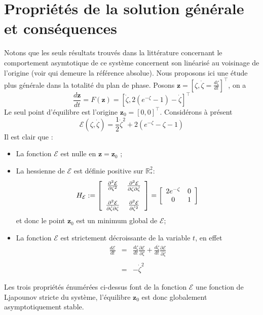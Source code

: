 \section{Propriétés de la solution générale et conséquences}
Notons que les seuls résultats trouvés dans la littérature concernant le comportement asymtotique de ce système concernent son linéarisé au voisinage de l'origine (voir \cite{chandra39} qui demeure la référence absolue). Nous proposons ici une étude plus générale dans la totalité du plan de phase. Posons $\mathbf{z}=\left[  \zeta,\dot{\zeta}=\frac{d\zeta}{dt}\right]  ^{\top}$, on a
\begin{equation}
\frac{d\mathbf{z}}{dt} =F\left(  \mathbf{z}\right)  =
\left[\dot{\zeta},2\left(  e^{-\zeta}-1\right)-\dot{\zeta}\right]^{\top} \label{sysdif}%
\end{equation}
Le seul point d'\'{e}quilibre est l'origine $\mathbf{z}_0=\left[  0,0\right]
^{\top}$. Considérons à présent  
$$
\mathcal{E}(\zeta,\dot{\zeta}) = \frac{1}{2}\dot{\zeta}^2+2(e^{-\zeta}-\zeta-1)
$$
Il est clair que :
\begin{itemize}
\item La fonction $\mathcal{E}$ est nulle en $\mathbf{z}=\mathbf{z}_0$ ;
\item La hessienne de $\mathcal{E}$ est définie positive sur $\mathbb{R}^2_*$: 
$$
H_{\mathcal{E}}:=
\left[
\begin{array}
[c]{cc}%
\frac{\partial^2 \mathcal{E}}{\partial \zeta^2}         & \frac{\partial^2 \mathcal{E}}{\partial \zeta \partial \dot{\zeta}}\\
 & \\
\frac{\partial^2 \mathcal{E}}{\partial \dot{\zeta} \partial \zeta}& \frac{\partial^2 \mathcal{E}}{\partial \dot{\zeta}^2}
\end{array}
\right]
=\left[\begin{array}
[c]{cc}%
2e^{-\zeta}         & 0\\
0& 1
\end{array}
\right]
$$
et donc le point $\mathbf{z}_0$ est un minimum global de $\mathcal{E}$;
\item La fonction $\mathcal{E}$ est strictement décroissante de la variable $t$, en effet
\begin{eqnarray*}
\frac{d\mathcal{E}}{dt}&=&\frac{d\zeta}{dt}\frac{\partial \mathcal{E}}{\partial \zeta}+\frac{d\dot{\zeta}}{dt}\frac{\partial \mathcal{E}}{\partial \dot{\zeta}} \\
& & \\
&=&-\dot{\zeta}^2 
\end{eqnarray*}

\end{itemize}
Les trois propriétés énumérées ci-dessus font de la fonction $\mathcal{E}$ une fonction de Ljapounov stricte du système, l'équilibre $\mathbf{z}_0$ est donc globalement asymptotiquement stable. 

